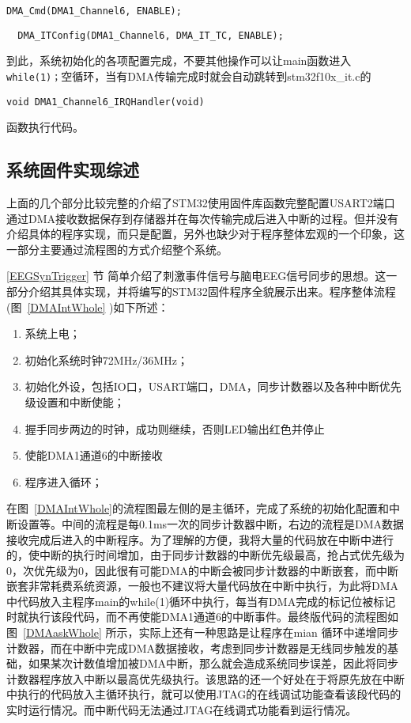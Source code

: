 \textit{\color{blue}{//使能DMA1的通道6}}

	\verb|DMA_Cmd(DMA1_Channel6, ENABLE);|

\textit{\color{blue}{//使能DMA1通道6的传输完成中断，也即一次完整DMA数据传输完成以后该中断标志位置位}}

\verb|	DMA_ITConfig(DMA1_Channel6, DMA_IT_TC, ENABLE);|

到此，系统初始化的各项配置完成，不要其他操作可以让main函数进入\verb|while(1)；|空循环，当有DMA传输完成时就会自动跳转到stm32f10x\_{}it.c的

\verb|void DMA1_Channel6_IRQHandler(void)|

函数执行代码。

\subsection{系统固件实现综述}

	上面的几个部分比较完整的介绍了STM32使用固件库函数完整配置USART2端口通过DMA接收数据保存到存储器并在每次传输完成后进入中断的过程。但并没有介绍具体的程序实现，而只是配置，另外也缺少对于程序整体宏观的一个印象，这一部分主要通过流程图的方式介绍整个系统。

	\ref{EEGSynTrigger} 节 简单介绍了刺激事件信号与脑电EEG信号同步的思想。这一部分介绍其具体实现，并将编写的STM32固件程序全貌展示出来。程序整体流程(图~\ref{DMAIntWhole} )如下所述：
\begin{enumerate}
\item 系统上电；
\item 初始化系统时钟72MHz/36MHz；
\item 初始化外设，包括IO口，USART端口，DMA，同步计数器以及各种中断优先级设置和中断使能；
\item 握手同步两边的时钟，成功则继续，否则LED输出红色并停止
\item 使能DMA1通道6的中断接收
\item 程序进入循环；
\end{enumerate}

在图~\ref{DMAIntWhole}的流程图最左侧的是主循环，完成了系统的初始化配置和中断设置等。中间的流程是每0.1ms一次的同步计数器中断，右边的流程是DMA数据接收完成后进入的中断程序。为了理解的方便，我将大量的代码放在中断中进行的，使中断的执行时间增加，由于同步计数器的中断优先级最高，抢占式优先级为0，次优先级为0，因此很有可能DMA的中断会被同步计数器的中断嵌套，而中断嵌套非常耗费系统资源，一般也不建议将大量代码放在中断中执行，为此将DMA中代码放入主程序main的while(1)循环中执行，每当有DMA完成的标记位被标记时就执行该段代码，而不再使能DMA1通道6的中断事件。最终版代码的流程图如图~\ref{DMAaskWhole} 所示，实际上还有一种思路是让程序在mian 循环中递增同步计数器，而在中断中完成DMA数据接收，考虑到同步计数器是无线同步触发的基础，如果某次计数值增加被DMA中断，那么就会造成系统同步误差，因此将同步计数器程序放入中断以最高优先级执行。该思路的还一个好处在于将原先放在中断中执行的代码放入主循环执行，就可以使用JTAG的在线调试功能查看该段代码的实时运行情况。而中断代码无法通过JTAG在线调式功能看到运行情况。

